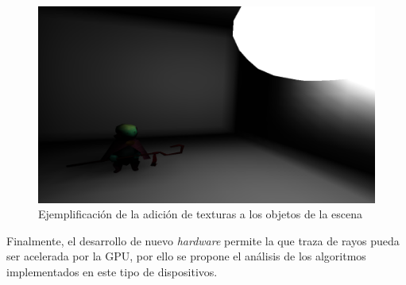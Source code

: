 \begin{figure}[H]
	\centering
	\includegraphics[width=.7\linewidth]{assets/text}
	\caption{Ejemplificación de la adición de texturas a los objetos de la escena}
	\label{img:text}
\end{figure}

Finalmente, el desarrollo de nuevo \textit{hardware} permite la que traza de rayos pueda ser acelerada por la GPU, por ello se propone el análisis de los algoritmos implementados en este tipo de dispositivos.
